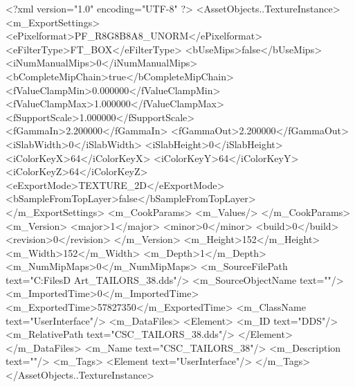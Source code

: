 <?xml version="1.0" encoding="UTF-8" ?>
<AssetObjects..TextureInstance>
	<m_ExportSettings>
		<ePixelformat>PF_R8G8B8A8_UNORM</ePixelformat>
		<eFilterType>FT_BOX</eFilterType>
		<bUseMips>false</bUseMips>
		<iNumManualMips>0</iNumManualMips>
		<bCompleteMipChain>true</bCompleteMipChain>
		<fValueClampMin>0.000000</fValueClampMin>
		<fValueClampMax>1.000000</fValueClampMax>
		<fSupportScale>1.000000</fSupportScale>
		<fGammaIn>2.200000</fGammaIn>
		<fGammaOut>2.200000</fGammaOut>
		<iSlabWidth>0</iSlabWidth>
		<iSlabHeight>0</iSlabHeight>
		<iColorKeyX>64</iColorKeyX>
		<iColorKeyY>64</iColorKeyY>
		<iColorKeyZ>64</iColorKeyZ>
		<eExportMode>TEXTURE_2D</eExportMode>
		<bSampleFromTopLayer>false</bSampleFromTopLayer>
	</m_ExportSettings>
	<m_CookParams>
		<m_Values/>
	</m_CookParams>
	<m_Version>
		<major>1</major>
		<minor>0</minor>
		<build>0</build>
		<revision>0</revision>
	</m_Version>
	<m_Height>152</m_Height>
	<m_Width>152</m_Width>
	<m_Depth>1</m_Depth>
	<m_NumMipMaps>0</m_NumMipMaps>
	<m_SourceFilePath text="C:\Users\Shadow\Desktop\Working Files\2D Art\Quarters\Tailors\CSC_TAILORS_38.dds"/>
	<m_SourceObjectName text=""/>
	<m_ImportedTime>0</m_ImportedTime>
	<m_ExportedTime>57827350</m_ExportedTime>
	<m_ClassName text="UserInterface"/>
	<m_DataFiles>
		<Element>
			<m_ID text="DDS"/>
			<m_RelativePath text="CSC_TAILORS_38.dds"/>
		</Element>
	</m_DataFiles>
	<m_Name text="CSC_TAILORS_38"/>
	<m_Description text=""/>
	<m_Tags>
		<Element text="UserInterface"/>
	</m_Tags>
</AssetObjects..TextureInstance>

